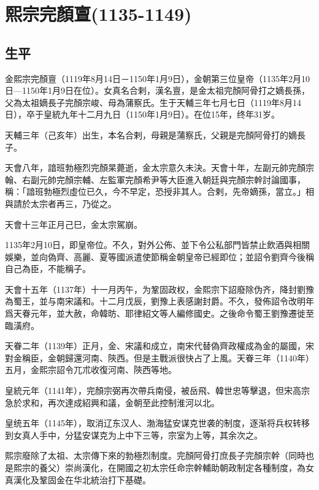 
\section{熙宗完顏亶\tiny(1135-1149)}

\subsection{生平}

金熙宗完顏亶（1119年8月14日－1150年1月9日），金朝第三位皇帝（1135年2月10日—1150年1月9日在位）。女真名合剌，漢名亶，是金太祖完顏阿骨打之嫡長孫，父為太祖嫡長子完顏宗峻、母為蒲察氏。生于天輔三年七月七日（1119年8月14日），卒于皇統九年十二月九日（1150年1月9日）。在位15年，终年31岁。

天輔三年（己亥年）出生，本名合剌，母親是蒲察氏，父親是完顏阿骨打的嫡長子。

天會八年，諳班勃極烈完顏杲薨逝，金太宗意久未決。天會十年，左副元帥完顏宗翰、右副元帥完顏宗輔、左監軍完顏希尹等大臣進入朝廷與完顏宗幹討論國事，稱：「諳班勃極烈虛位已久，今不早定，恐授非其人。合剌，先帝嫡孫，當立。」相與請於太宗者再三，乃從之。

天會十三年正月己巳，金太宗駕崩。

1135年2月10日，即皇帝位。不久，對外公佈、並下令公私部門皆禁止飲酒與相關娛樂，並向偽齊、高麗、夏等國派遣使節稱金朝皇帝已經即位；並詔令劉齊今後稱自己為臣，不能稱子。

天會十五年（1137年）十一月丙午，为鞏固政权，金熙宗下詔廢除伪齐，降封劉豫為蜀王，並与南宋議和。十二月戊辰，劉豫上表感謝封爵。不久，發佈詔令改明年爲天眷元年，並大赦，命韓昉、耶律紹文等人編修國史。之後命令蜀王劉豫遷徙至臨潢府。

天眷二年（1139年）正月，金、宋議和成立，南宋代替偽齊政權成為金的屬國，宋對金稱臣，金朝歸還河南、陝西。但是主戰派很快占了上風。天眷三年（1140年）五月，金熙宗詔令兀朮收復河南、陝西等地。

皇統元年（1141年），完顏宗弼再次帶兵南侵，被岳飛、韓世忠等擊退，但宋高宗急於求和，再次達成紹興和議，金朝至此控制淮河以北。

皇统五年（1145年），取消辽东汉人、渤海猛安谋克世袭的制度，逐渐将兵权转移到女真人手中，分猛安谋克为上中下三等，宗室为上等，其余次之。

熙宗廢除了太祖、太宗傳下來的勃極烈制度。完顏阿骨打庶長子完顏宗幹（同時也是熙宗的養父）崇尚漢化，在開國之初太宗任命宗幹輔助朝政制定各種制度，為女真漢化及鞏固金在华北統治打下基礎。

